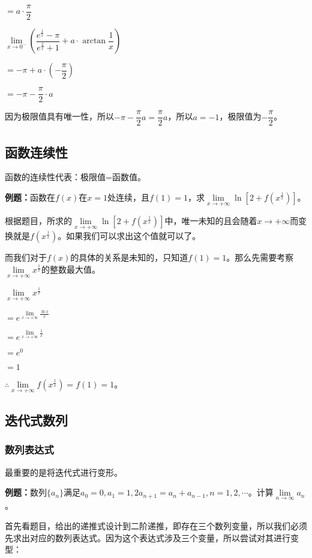 \documentclass[UTF8, 12pt]{ctexart}
\begin{document}
$= a\cdot\dfrac{\pi}{2}$

\medskip

$\lim\limits_{x\to 0^-}\left(\dfrac{e^{\frac{1}{x}}-\pi}{e^{\frac{2}{x}}+1}+a\cdot\arctan\dfrac{1}{x}\right)$

$= -\pi+a\cdot\left(-\dfrac{\pi}{2}\right)$

$= -\pi-\dfrac{\pi}{2}\cdot a$

因为极限值具有唯一性，所以$-\pi-\dfrac{\pi}{2}a=\dfrac{\pi}{2}a$，所以$a=-1$，极限值为$-\dfrac{\pi}{2}$。

\subsection{函数连续性}

函数的连续性代表：极限值=函数值。

\textbf{例题：}函数在$f(x)$在$x=1$处连续，且$f(1)=1$，求$\lim\limits_{x\to+\infty}\ln\left[2+f\left(x^{\frac{1}{x}}\right)\right]$。

根据题目，所求的$\lim\limits_{x\to+\infty}\ln\left[2+f\left(x^{\frac{1}{x}}\right)\right]$中，唯一未知的且会随着$x\to+\infty$而变换就是$f\left(x^{\frac{1}{x}}\right)$。如果我们可以求出这个值就可以了。

而我们对于$f(x)$的具体的关系是未知的，只知道$f(1)=1$。那么先需要考察$\lim\limits_{x\to+\infty}x^{\frac{1}{x}}$的整数最大值。

$\lim\limits_{x\to+\infty}x^{\frac{1}{x}}$

$=e^{\lim\limits_{x\to+\infty}\frac{\ln x}{x}}$

$=e^{\lim\limits_{x\to+\infty}\frac{1}{x}}$

$=e^0$

$=1$

$\therefore\lim\limits_{x\to+\infty}f(x^{\frac{1}{x}})=f(1)=1$。

\subsection{迭代式数列}

\subsubsection{数列表达式}

最重要的是将迭代式进行变形。

\textbf{例题：}数列$\{a_n\}$满足$a_0=0,a_1=1,2a_{n+1}=a_n+a_{n-1},n=1,2,\cdots$。计算$\lim\limits_{n\to\infty}a_n$。

首先看题目，给出的递推式设计到二阶递推，即存在三个数列变量，所以我们必须先求出对应的数列表达式。因为这个表达式涉及三个变量，所以尝试对其进行变型：
\end{document}
